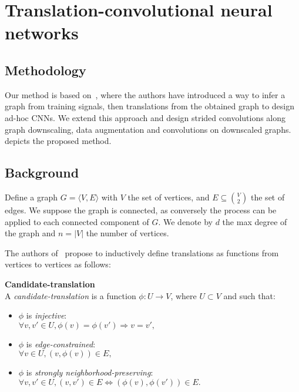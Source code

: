 \section{Translation-convolutional neural networks}

\subsection{Methodology}


Our method is based on~\cite{pasdeloup2017convolutional}, where the authors have introduced a way to infer a graph from training signals, then translations from the obtained graph to design ad-hoc CNNs. We extend this approach and design strided convolutions along graph downscaling, data augmentation and convolutions on downscaled graphs.  depicts the proposed method.



\subsection{Background}

Define a graph $G = \langle V, E \rangle$ with $V$ the set of vertices, and $E \subseteq\binom{V}{2}$ the set of edges. We suppose the graph is connected, as conversely the process can be applied to each connected component of $G$. We denote by $d$ the max degree of the graph and $n = |V|$ the number of vertices.

The authors of~\cite{pasdeloup2017convolutional} propose to inductively define translations as functions from vertices to vertices as follows:

\begin{definition}\textbf{Candidate-translation}\\
  A \emph{candidate-translation} is a function $\phi: U \to V$, where $U \subset V$ and such that:
  \begin{itemize}[noitemsep,nolistsep]
  \item $\phi$ is \emph{injective}:\\
  $\forall v,v' \in U, \phi(v) = \phi(v') \Rightarrow v = v',$
  \item $\phi$ is \emph{edge-constrained}:\\
  $\forall v \in U, (v,\phi(v)) \in E,$
  \item $\phi$ is \emph{strongly neighborhood-preserving}:\\
  $\forall v,v' \in U, (v,v')\in E \Leftrightarrow (\phi(v),\phi(v')) \in E.$
  \end{itemize}
\end{definition}

